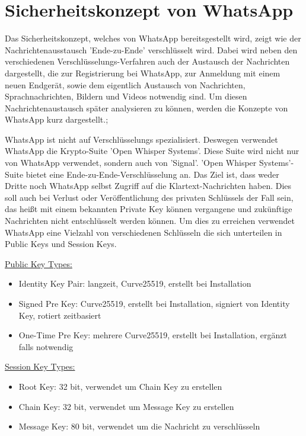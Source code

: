 \section{Sicherheitskonzept von WhatsApp}\label{sec:kaptiel}
Das Sicherheitskonzept, welches von WhatsApp bereitsgestellt wird, zeigt wie
der Nachrichtenausstausch 'Ende-zu-Ende' verschlüsselt wird. Dabei wird neben
den verschiedenen Verschlüsselungs-Verfahren auch der Austausch der Nachrichten
dargestellt, die zur Registrierung bei WhatsApp, zur Anmeldung mit einem neuen
Endgerät, sowie dem eigentlich Austausch von Nachrichten, Sprachnachrichten, Bildern
und Videos notwendig sind. 
Um diesen Nachrichtenaustausch später analysieren zu können, werden die Konzepte
von WhatsApp kurz dargestellt.\cite{ENCOV}; 

WhatsApp ist nicht auf Verschlüsselungs spezialisiert. Deswegen verwendet WhatsApp
die Krypto-Suite 'Open Whisper Systems'. Diese Suite wird nicht nur von WhatsApp verwendet, 
sondern auch von 'Signal'.
'Open Whisper Systems'-Suite bietet eine Ende-zu-Ende-Verschlüsselung an. Das Ziel
ist, dass weder Dritte noch WhatsApp selbst Zugriff auf die Klartext-Nachrichten haben.
Dies soll auch bei Verlust oder Veröffentlichung des privaten Schlüssels der Fall sein, 
das heißt mit einem bekannten Private Key können vergangene und zukünftige Nachrichten
nicht entschlüsselt werden können. Um dies zu erreichen verwendet WhatsApp eine 
Vielzahl von verschiedenen Schlüsseln die sich unterteilen in Public Keys und Session Keys. 

\underline{Public Key Types: }
    \begin{itemize}
        \item Identity Key Pair: langzeit, Curve25519, erstellt bei Installation 
        \item Signed Pre Key: Curve25519, erstellt bei Installation, signiert von Identity Key, rotiert zeitbasiert
        \item One-Time Pre Key: mehrere Curve25519, erstellt bei Installation, ergänzt falls notwendig
    \end{itemize}
    
\underline{Session Key Types:}
    \begin{itemize}
        \item Root Key: 32 bit, verwendet um Chain Key zu erstellen
        \item Chain Key: 32 bit, verwendet um Message Key zu erstellen
        \item Message Key: 80 bit, verwendet um die Nachricht zu verschlüsseln 
    \end{itemize}

